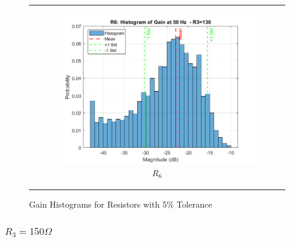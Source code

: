 \documentclass[hidelinks,12pt]{article}
\begin{document}
\begin{figure}[!h]
{\begin{tabular}{c}
\begin{subfigure}[h]{0.4\textwidth}
					\includegraphics[width=\textwidth]{figures/r3=130/r6.png}
					\caption{$R_6$}
				\end{subfigure}
			\end{tabular}
		}
		\caption{Gain Histograms for Resistors with 5\% Tolerance}
	\end{figure}
	
	
	
	
	\pagebreak
	
	
	
	\subsubsection{$R_3 = 150\Omega$}
	
\end{document}
